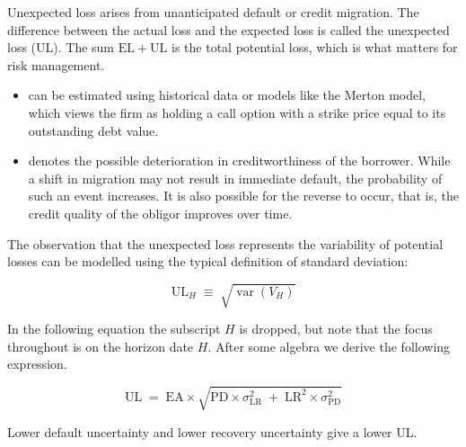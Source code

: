 Unexpected loss arises from unanticipated default or credit migration. The
difference between the actual loss and the expected loss is called the
unexpected loss (UL). The sum $\mathrm{EL} + \mathrm{UL}$ is the total potential
loss, which is what matters for risk management.

\begin{itemize}
\item {} can be estimated using historical data or models
like the Merton model, which views the firm as holding a call option with a
strike price equal to its outstanding debt value.
\item {} denotes the possible deterioration in
creditworthiness of the borrower. While a shift in migration may not result in
immediate default, the probability of such an event increases. It is also
possible for the reverse to occur, that is, the credit quality of the obligor
improves over time.
\end{itemize}


The observation that the unexpected loss represents the variability of potential
losses can be modelled using the typical definition of standard deviation:

\[ \mathrm{UL}_H \;\equiv\; \sqrt{\operatorname{var}(V_H)} \]

In the following equation the subscript $H$ is dropped, but note that the focus
throughout is on the horizon date $H$. After some algebra we derive the following
expression.

\begin{crfmlbox}
\[ \mathrm{UL} \;=\; \mathrm{EA} \times \sqrt{\mathrm{PD}\times\sigma^{2}_{\mathrm{LR}}
   \;+\; \mathrm{LR}^{2}\times\sigma^{2}_{\mathrm{PD}}} \]
\end{crfmlbox}

Lower default uncertainty and lower recovery uncertainty give a lower UL.


